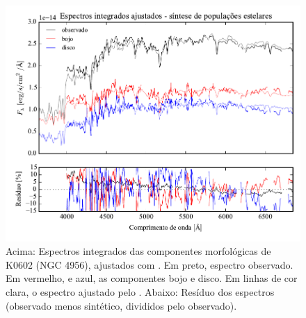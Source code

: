 \begin{figure}
	\includegraphics[page=7,width=\textwidth]{figuras/sample006a_synthesis}
	\caption[Espectros ajustados com \starlight das componentes morfológicas de
	K0602 (NGC 4956)]
	{Acima: Espectros integrados das componentes morfológicas de
	K0602 (NGC 4956), ajustados com \starlight. Em preto, espectro observado. Em
	vermelho, e azul, as componentes bojo e disco. Em linhas de cor clara, o
	espectro ajustado pelo \starlight. Abaixo: Resíduo dos espectros (observado
	menos sintético, divididos pelo observado).}
	\label{fig:decompSintese:K0602}
\end{figure}

